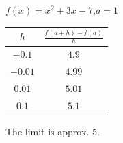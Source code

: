 {$f(x) = x^2+3x-7$,\quad  $a=1$}
{\begin{tabular}{cc}
$h$ & $\frac{f(a+h)-f(a)}{h}$\\ \hline 
 $-0.1$ & $4.9$ \\
 $-0.01$ & $4.99$ \\
 $0.01$ & $5.01$ \\
 $0.1$ & $5.1$
\end{tabular}

The limit is approx. 5.
}


